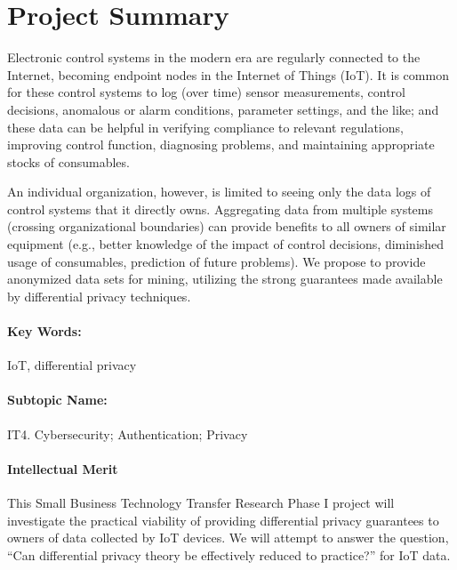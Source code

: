 \clearpage
\section*{Project Summary}

%

Electronic control systems in the modern era are regularly connected
to the Internet, becoming endpoint nodes in the Internet of Things (IoT).
It is common for these control systems to log (over time) sensor measurements,
control decisions, anomalous or alarm conditions, parameter settings,
and the like; and these data can be helpful in verifying compliance to
relevant regulations, improving control function, diagnosing problems,
and maintaining appropriate stocks of consumables.

An individual organization, however, is limited to seeing only the data logs
of control systems that it directly owns. Aggregating data from multiple
systems (crossing organizational boundaries) can provide benefits to all
owners of similar equipment (e.g., better knowledge of the impact of
control decisions, diminished usage of consumables, prediction of future
problems). We propose to provide anonymized data sets for mining, utilizing
the strong guarantees made available by differential privacy techniques.

\paragraph{Key Words:} IoT, differential privacy

\paragraph{Subtopic Name:} IT4. Cybersecurity; Authentication; Privacy

\medskip

\paragraph{Intellectual Merit}
This Small Business Technology Transfer Research Phase I project will
investigate
the practical viability of providing differential privacy guarantees to
owners of data collected by IoT devices.  We will attempt to answer the
question, ``Can differential privacy theory be effectively reduced to
practice?'' for IoT data.

